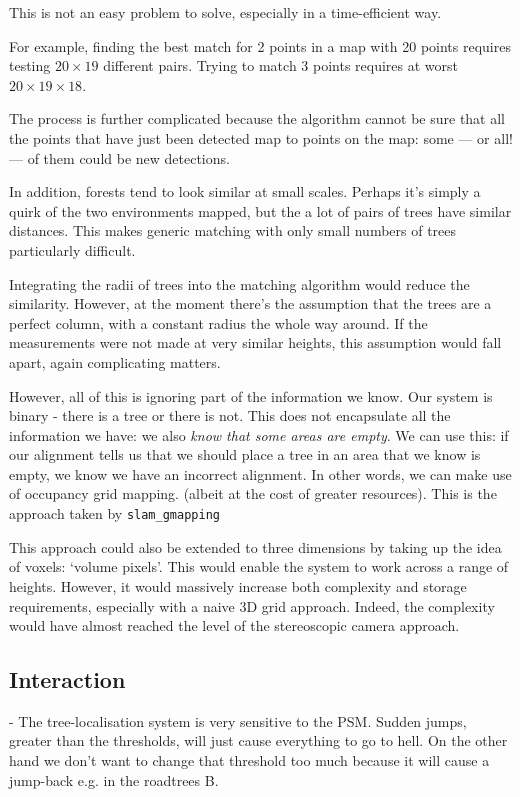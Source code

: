 \documentclass[12pt,oneside,a4paper]{book}
\begin{document}
This is not an easy problem to solve, especially in a time-efficient
way. 

For example, finding the best match for 2 points in a map with 20
points requires testing $20 \times 19$ different pairs. Trying to
match 3 points requires at worst $20 \times 19 \times 18$. 

The process is further complicated because the algorithm cannot be
sure that all the points that have just been detected map to points on
the map: some --- or all! --- of them could be new detections.

In addition, forests tend to look similar at small scales. Perhaps
it's simply a quirk of the two environments mapped, but the a lot of
pairs of trees have similar distances. This makes generic matching
with only small numbers of trees particularly difficult.

Integrating the radii of trees into the matching algorithm would
reduce the similarity. However, at the moment there's the assumption
that the trees are a perfect column, with a constant radius the whole
way around. If the measurements were not made at very similar heights,
this assumption would fall apart, again complicating matters.

However, all of this is ignoring part of the information we know. Our
system is binary - there is a tree or there is not. This does not
encapsulate all the information we have: we also \emph{know that some areas
are empty}. We can use this: if our alignment tells us that we should
place a tree in an area that we know is empty, we know we have an
incorrect alignment. In other words, we can make use of occupancy grid
mapping. (albeit at the cost of greater resources). This is the
approach taken by \texttt{slam\_gmapping} 

This approach could also be extended to three dimensions by taking up
the idea of voxels: `volume pixels'. This would enable the system to
work across a range of heights. However, it would massively increase
both complexity and storage requirements, especially with a naive 3D
grid approach. Indeed, the complexity would have almost reached the
level of the stereoscopic camera approach.


\subsection{Interaction}
\label{sec:interaction}

 - The tree-localisation system is very sensitive to the PSM. Sudden jumps, greater than
 the thresholds, will just cause everything to go to hell. On the
 other hand we don't want to change that threshold too much because it
 will cause a jump-back e.g. in the roadtrees B.
\end{document}
